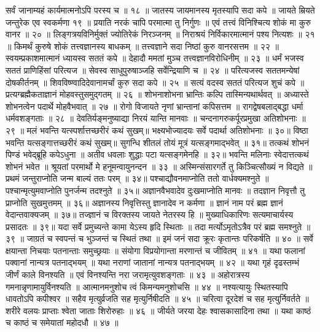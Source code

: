 सर्वं जानाम्यहं कार्यमात्मनोऽपि परस्य च ॥ १८ ॥
जातस्य जायमानस्य मृतस्यापि सदा कपे ॥
जायते म्रियते जन्तुरेक एव स्वकर्मणा १९ ॥
प्रयाति नरकं चापि परमात्मा तु निर्गुणः ॥
एवं तत्त्वं विनिश्चित्य शोकं मा कुरु वानर ॥ २० ॥
लिङ्गत्रयविनिर्मुक्तं ज्योतिरेकं निरञ्जनम् ॥
निराश्रयं निर्विकारमात्मानं पश्य नित्यशः ॥ २१ ॥
किमर्थं कुरुषे शोकं तत्त्वज्ञानस्य बाधकम् ॥
तत्त्वज्ञाने सदा निष्ठां कुरु वानरसत्तम ॥ २२ ॥
स्वयम्प्रकाशमात्मानं ध्यायस्व सततं कपे ॥
देहादौ ममतां मुञ्च तत्त्वज्ञानविरोधिनीम् ॥ २३ ॥
धर्मं भजस्व सततं प्राणिहिंसां परित्यज ॥
सेवस्व साधुपुरुषाञ्जहि सर्वेन्द्रियाणि च ॥ २४ ॥
परित्यजस्व सततमन्येषां दोषकीर्तनम् ॥
शिवविष्ण्वादिदेवानामर्चां कुरु सदा कपे ॥ २५ ॥
सत्यं वदस्व सततं परित्यज शुचं कपे ॥
प्रत्यग्ब्रह्मैकताज्ञानं मोहवस्तुसमुद्गतम् ॥ २६ ॥
शोभनाशोभना भ्रान्तिः कल्पि तास्मिन्यथार्थवत् ॥
अध्यास्ते शोभनत्वेन पदार्थे मोहवैभवात् ॥ २७ ॥
रोगो विजायते नृणां भ्रान्तानां कपिसत्तम ॥
रागद्वेषबलाद्बद्धा धर्मा धर्मवशङ्गताः ॥ २८ ॥
देवतिर्यङ्मनुष्याद्या निरयं यान्ति मानवाः ॥
चन्दनागरुकर्पूरप्रमुखा अतिशोभनाः ॥ २९ ॥
मलं भवन्ति यत्स्पर्शात्तच्छरीरं कथं सुखम्॥
भक्ष्यभोज्यादयः सर्वे पदार्था अतिशोभनाः ॥ ३०॥
विष्ठा भवन्ति यत्सङ्गात्तच्छरीरं कथं सुखम्॥
सुगन्धि शीतलं तोयं मूत्रं यत्सङ्गमाद्भवेत् ॥ ३१॥
तत्कथं शोभनं पिण्डं भवेद्ब्रूहि कपेऽधुना ॥
अतीव धवलाः शुद्धाः पटा यत्सङ्गमेनहि ॥ ३२॥
भवन्ति मलिनाः स्वेदात्तत्कथं शोभनं भवेत ॥
श्रूयतां परमार्थो मे हनूमन्वायुनन्दन ॥ ३३ ॥
अस्मिन्संसारगर्ते तु किञ्चित्सौख्यं न विद्यते ॥
प्रथमं जन्तुराप्नोति जन्म बाल्यं ततः परम् ॥ ३४॥
पश्चाद्यौवनमाप्नोति ततो वार्धक्यमश्नुते ॥
पश्चान्मृत्युमवाप्नोति पुनर्जन्म तदश्नुते ॥ ३५॥
अज्ञानवैभवादेव दुःखमाप्नोति मानवः ॥
तदज्ञान निवृत्तौ तु प्राप्नोति सुखमुत्तमम् ॥ ३६॥
अज्ञानस्य निवृत्तिस्तु ज्ञानादेव न कर्मणा ॥
ज्ञानं नाम परं ब्रह्म ज्ञानं वेदान्तवाक्यजम् ॥ ३७॥
तज्ज्ञानं च विरक्तस्य जायते नेतरस्य हि ॥
मुख्याधिकारिणः सत्यमाचार्यस्य प्रसादतः ॥ ३९॥
यदा सर्वे प्रमुच्यन्ते कामा येऽस्य हृदि स्थिताः ॥
तदा मर्त्योऽमृतोऽत्रैव परं ब्रह्म समश्नुते ॥ ३९ ॥
जाग्रतं च स्वपन्तं च भुञ्जन्तं च स्थितं तथा ॥
इमं जनं सदा क्रूरः कृतान्तः परिकर्षति ॥ ४० ॥
सर्वे क्षयान्ता निचयाः पतनान्ताः समुच्छ्रयाः ॥
संयोगा विप्रयोगान्ता मरणान्तं च जीवितम् ॥ ४१ ॥
यथा फलानां पक्वानां नान्यत्र पतनाद्भयम् ॥
यथा नराणां जातानां नान्यत्र पतनाद्भयम् ॥ ४२ ॥
यथा गृहं दृढस्तम्भं जीर्णं काले विनश्यति ॥
एवं विनश्यन्ति नरा जरामृत्युवशङ्गताः ॥ ४३ ॥
अहोरात्रस्य गमनान्नृणामायुर्विनश्यति ॥
आत्मानमनुशोच त्वं किमन्यमनुशोचसि ॥ ४४ ॥
नश्यत्यायुः स्थितस्यापि धावतोऽपि कपीश्वर ॥
सहैव मृत्युर्व्रजति सह मृत्युर्निषीदति ॥ ४५ ॥
चरित्वा दूरदेशं च सह मृत्युर्निवर्तते ॥
शरीरे वलयः प्राप्ताः श्वेता जाताः शिरोरुहाः ॥ ४६ ॥
जीर्यते जरया देहः श्वासकासादिना तथा ॥
यथा काष्ठं च काष्ठं च समेयातां महोदधौ ॥ ४७ ॥
